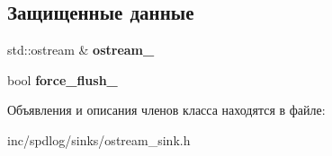 \subsection*{Защищенные данные}
\begin{DoxyCompactItemize}
\item 
\mbox{\label{classspdlog_1_1sinks_1_1ostream__sink_a53db4ea84203737b100365438d1951b4}} 
std\+::ostream \& {\bfseries ostream\+\_\+}
\item 
\mbox{\label{classspdlog_1_1sinks_1_1ostream__sink_a5778019dfdf7dc09ea798c490810eaed}} 
bool {\bfseries force\+\_\+flush\+\_\+}
\end{DoxyCompactItemize}


Объявления и описания членов класса находятся в файле\+:\begin{DoxyCompactItemize}
\item 
inc/spdlog/sinks/ostream\+\_\+sink.\+h\end{DoxyCompactItemize}
